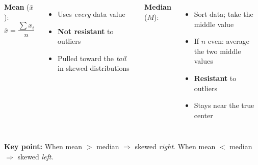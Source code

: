 \documentclass[aspectratio=169, 11pt]{beamer}
\begin{document}
{
\begin{frame}[t, plain]
  \vspace{1em}%
  \hspace{0.55cm}%
  \begin{minipage}{0.9\textwidth}
    \begin{columns}[t]
        \small
        \textbf{\color{navy}Mean} ($\bar{x}$):
        \[\bar{x} = \frac{\sum x_i}{n}\]
        \begin{itemize}\setlength{\itemsep}{0.4em}
          \item Uses \textit{every} data value
          \item \textbf{Not resistant} to outliers
          \item Pulled toward the \textit{tail} in skewed distributions
        \end{itemize}

        \small
        \textbf{\color{navy}Median} ($M$):
        \begin{itemize}\setlength{\itemsep}{0.4em}
          \item Sort data; take the middle value
          \item If $n$ even: average the two middle values
          \item \textbf{Resistant} to outliers
          \item Stays near the true center
        \end{itemize}
    \end{columns}

    \vspace{0.5cm}
    {\color{navy}\bfseries\small Key point:}
    When mean $>$ median $\Rightarrow$ skewed \textit{right}.\quad
    When mean $<$ median $\Rightarrow$ skewed \textit{left}.
  \end{minipage}
\end{frame}
}
\end{document}
